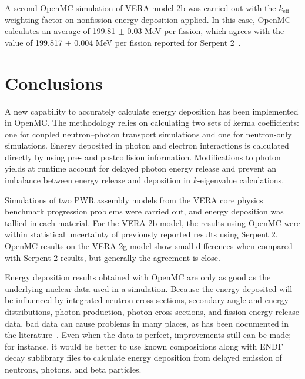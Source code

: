 \documentclass{anstrans}
\begin{document}
A second OpenMC simulation of VERA model 2b was carried out with the
$k_\text{eff}$ weighting factor on nonfission energy deposition applied. In this
case, OpenMC calculates an average of 199.81 $\pm$ 0.03 MeV per fission, which
agrees with the value of 199.817 $\pm$ 0.004 MeV per fission reported for
Serpent 2~\cite{tuominen2019ane}.


\section{Conclusions}

A new capability to accurately calculate energy deposition has been implemented
in OpenMC. The methodology relies on calculating two sets of kerma coefficients:
one for coupled neutron--photon transport simulations and one for neutron-only
simulations. Energy deposited in photon and electron interactions is calculated
directly by using pre- and postcollision information. Modifications to photon
yields at runtime account for delayed photon energy release and prevent an
imbalance between energy release and deposition in $k$-eigenvalue calculations.

Simulations of two PWR assembly models from the VERA core physics benchmark
progression problems were carried out, and energy deposition was tallied in each
material. For the VERA 2b model, the results using OpenMC were within
statistical uncertainty of previously reported results using Serpent 2. OpenMC
results on the VERA 2g model show small differences when compared with Serpent 2
results, but generally the agreement is close.

Energy deposition results obtained with OpenMC are only as good as the
underlying nuclear data used in a simulation. Because the energy deposited will
be influenced by integrated neutron cross sections, secondary angle and energy
distributions, photon production, photon cross sections, and fission energy
release data, bad data can cause problems in many places, as has been documented
in the literature~\cite{trumbull2013mc,tuominen2019ane}. Even when the data is
perfect, improvements still can be made; for instance, it would be better to use
known compositions along with ENDF decay sublibrary files to calculate energy
deposition from delayed emission of neutrons, photons, and beta particles.

\pagebreak

\end{document}
